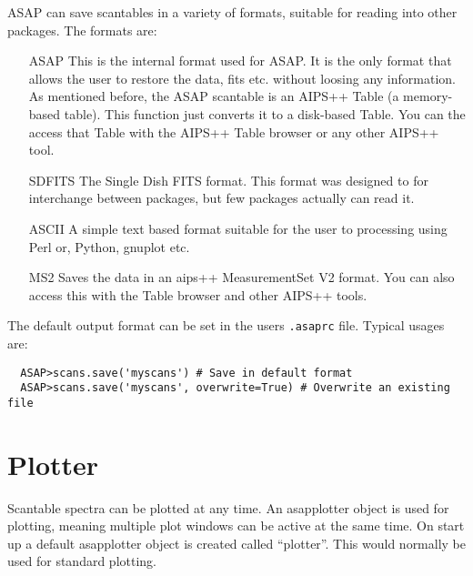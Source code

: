 \documentclass[11pt]{article}
\begin{document}
ASAP can save scantables in a
variety of formats, suitable for reading into other packages. The
formats are:

\begin{itemize}
\item[ASAP] This is the internal format used for ASAP. It is the only
  format that allows the user to restore the data, fits etc. without
  loosing any information.  As mentioned before, the ASAP scantable is
  an AIPS++ Table (a memory-based table).  This function just converts
  it to a disk-based Table.  You can the access that Table with the
  AIPS++ Table browser or any other AIPS++ tool.

\item[SDFITS] The Single Dish FITS format. This format was designed to
  for interchange between packages, but few packages actually can read
  it.


\item[ASCII] A simple text based format suitable for the user to
processing using Perl or, Python, gnuplot etc.

\item[MS2] Saves the data in an aips++ MeasurementSet V2 format.
You can also access this with the Table browser and other AIPS++
tools.

\end{itemize}

The default output format can be set in the users {\tt .asaprc} file.
Typical usages are:

\begin{verbatim}
  ASAP>scans.save('myscans') # Save in default format
  ASAP>scans.save('myscans', overwrite=True) # Overwrite an existing file
\end{verbatim}

\section{Plotter}

Scantable spectra can be plotted at any time. An
asapplotter object is used for plotting, meaning multiple plot windows
can be active at the same time. On start up a default asapplotter
object is created called ``plotter''. This would normally be used for
standard plotting.
\end{document}
